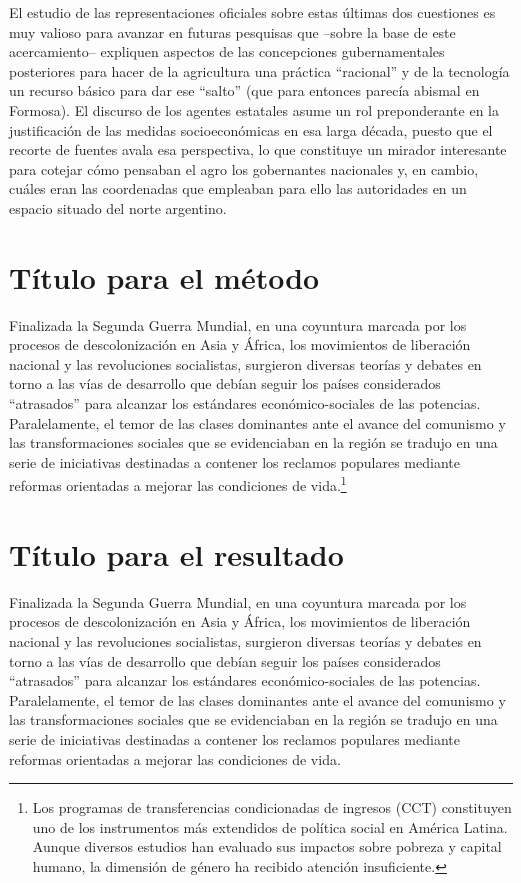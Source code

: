 El estudio de las representaciones oficiales sobre estas últimas dos cuestiones es muy valioso para avanzar en futuras pesquisas que –sobre la base de este acercamiento– expliquen aspectos de las concepciones gubernamentales posteriores para hacer de la agricultura una práctica “racional” y de la tecnología un recurso básico para dar ese “salto” (que para entonces parecía abismal en Formosa). El discurso de los agentes estatales asume un rol preponderante en la justificación de las medidas socioeconómicas en esa larga década, puesto que el recorte de fuentes avala esa perspectiva, lo que constituye un mirador interesante para cotejar cómo pensaban el agro los gobernantes nacionales y, en cambio, cuáles eran las coordenadas que empleaban para ello las autoridades en un espacio situado del norte argentino.


\section{Título para el método}
Finalizada la Segunda Guerra Mundial, en una coyuntura marcada por los procesos de descolonización en Asia y África, los movimientos de liberación nacional y las revoluciones socialistas, surgieron diversas teorías y debates en torno a las vías de desarrollo que debían seguir los países considerados “atrasados” para alcanzar los estándares económico-sociales de las potencias. Paralelamente, el temor de las clases dominantes ante el avance del comunismo y las transformaciones sociales que se evidenciaban en la región se tradujo en una serie de iniciativas destinadas a contener los reclamos populares mediante reformas orientadas a mejorar las condiciones de vida.\footnote{Los programas de transferencias condicionadas de ingresos (CCT)
  constituyen uno de los instrumentos más extendidos de política social en
  América Latina. Aunque diversos estudios han evaluado sus impactos sobre
  pobreza y capital humano, la dimensión de género ha recibido atención
  insuficiente.}


\section{Título para el resultado}
Finalizada la Segunda Guerra Mundial, en una coyuntura marcada por los procesos de descolonización en Asia y África, los movimientos de liberación nacional y las revoluciones socialistas, surgieron diversas teorías y debates en torno a las vías de desarrollo que debían seguir los países considerados “atrasados” para alcanzar los estándares económico-sociales de las potencias. Paralelamente, el temor de las clases dominantes ante el avance del comunismo y las transformaciones sociales que se evidenciaban en la región se tradujo en una serie de iniciativas destinadas a contener los reclamos populares mediante reformas orientadas a mejorar las condiciones de vida.


